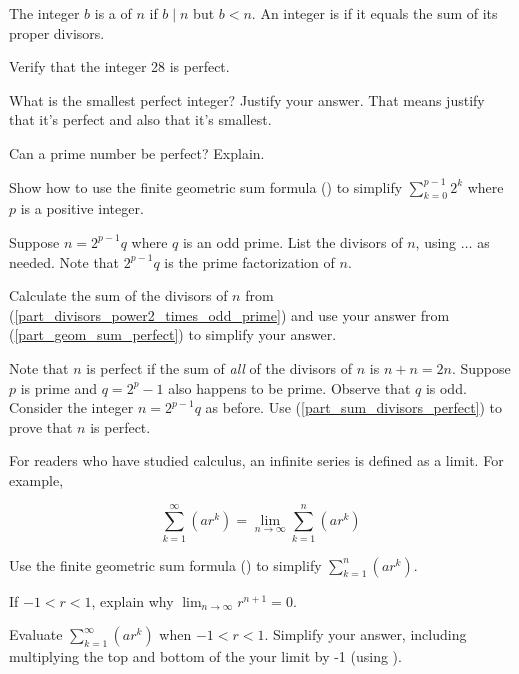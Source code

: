 \begin{exer}[\exerE] %
\label{exer_perfect}
    The integer $b$ is a  of $n$ if $b \mid n$ but $b < n$. An integer is  if it equals the sum of its proper divisors. 
        \begin{exerpart}
            \item Verify that the integer 28 is perfect.
            \item What is the smallest perfect integer?  Justify your answer. That means justify that it's perfect and also that it's smallest.
            \item Can a prime number be perfect?  Explain.
            \item \label{part_geom_sum_perfect} Show how to use the finite geometric sum formula () to simplify $\displaystyle \sum_{k=0}^{p-1}2^k$ where $p$ is a positive integer.
            \item \label{part_divisors_power2_times_odd_prime} Suppose $n = 2^{p-1}q$ where $q$ is an odd prime.  List the divisors of $n$, using $\ldots$ as needed.  Note that $2^{p-1}q$ is the prime factorization of $n$.  
            \item  \label{part_sum_divisors_perfect} Calculate the sum of the divisors of $n$ from (\ref{part_divisors_power2_times_odd_prime}) and use your answer from (\ref{part_geom_sum_perfect}) to simplify your answer.
            \item Note that $n$ is perfect if the sum of \emph{all} of the divisors of $n$ is $n+n=2n$. Suppose $p$ is prime and $q=2^p-1$ also happens to be prime.  Observe that $q$ is odd. Consider the integer $n = 2^{p-1}q$ as before. Use (\ref{part_sum_divisors_perfect}) to prove that $n$ is perfect.
        \end{exerpart}
\end{exer}

\begin{exer}[\exerE] %
\label{exer_infinite_geom_sum}
    For readers who have studied calculus, an infinite series is defined as a limit.  For example,
       
 $$\sum_{k=1}^\infty (ar^k) = \lim_{n \to \infty} \sum_{k=1}^n (ar^k)$$
    \begin{exerpart}
        \item Use the finite geometric sum formula () to simplify $\displaystyle \sum_{k=1}^n (ar^k)$. 
        \item If $-1<r<1$, explain why $\displaystyle \lim_{n \to \infty} r^{n+1} = 0$.
        \item Evaluate $\displaystyle \sum_{k=1}^\infty (ar^k)$  when $-1 < r < 1$.  Simplify your answer, including multiplying the top and bottom of the your limit by -1 (using ).
    \end{exerpart}
\end{exer}

